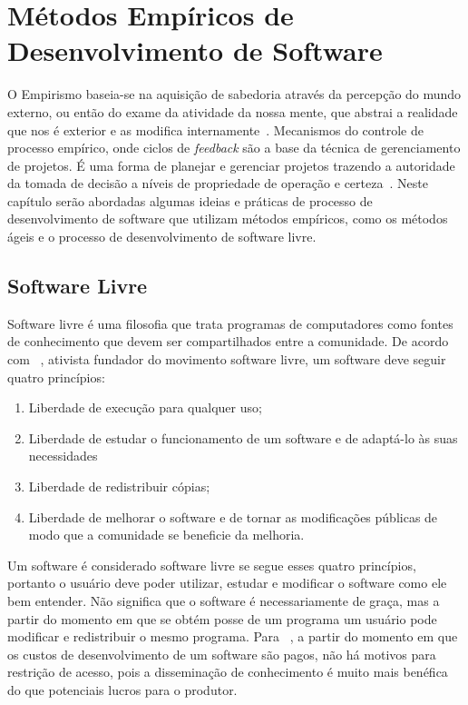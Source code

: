 \chapter{Métodos Empíricos de Desenvolvimento de Software}
\label{cap:desenvolvimento-empirico}

O Empirismo baseia-se na aquisição de sabedoria através da percepção do mundo 
externo, ou então do exame da atividade da nossa mente, que abstrai a realidade 
que nos é exterior e as modifica internamente~\cite{chaui2003}.
%
Mecanismos do controle de processo empírico, onde ciclos de \emph{feedback} são a base da técnica de gerenciamento de projetos.
%
É uma forma de planejar e gerenciar projetos trazendo a autoridade da tomada de decisão a níveis de propriedade de operação e certeza~\cite{Schwaber2004}.
%
Neste capítulo serão abordadas algumas ideias e práticas de processo de desenvolvimento
de software que utilizam métodos empíricos, como os métodos ágeis e o processo
de desenvolvimento de software livre.
%
\section{Software Livre}

Software livre é uma filosofia que trata programas de computadores como fontes de 
conhecimento que devem ser compartilhados entre a comunidade.
%
De acordo com ~, ativista fundador do movimento software livre, um software deve seguir quatro princípios:
%
\begin{enumerate}
\item Liberdade de execução para qualquer uso;
\item Liberdade de estudar o funcionamento de um software e de adaptá-lo às suas 
necessidades
\item Liberdade de redistribuir cópias;
\item Liberdade de melhorar o software e de tornar as modificações públicas de modo 
que a comunidade se beneficie da melhoria.
\end{enumerate}
%
Um software é considerado software livre se segue esses quatro princípios, portanto 
o usuário deve poder utilizar, estudar e modificar o software como ele bem entender. Não significa que o software é necessariamente de graça, mas a partir do momento em 
que se obtém posse de um programa um usuário pode modificar e redistribuir o mesmo 
programa.
%
Para ~, a partir do momento em que os custos de desenvolvimento de um software são pagos, não há motivos para restrição de acesso, pois a disseminação de conhecimento é muito mais benéfica do que potenciais lucros para o produtor.


